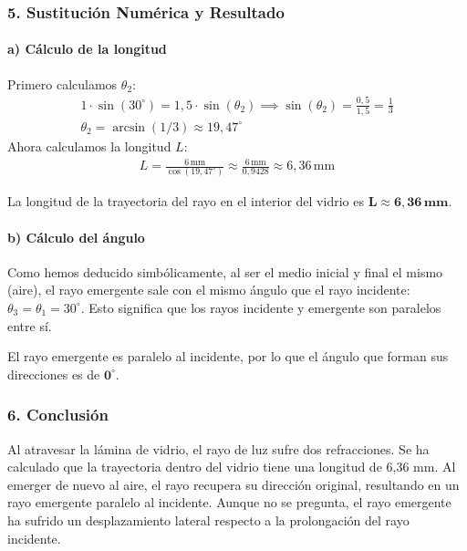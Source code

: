 \subsubsection*{5. Sustitución Numérica y Resultado}
\paragraph{a) Cálculo de la longitud}
Primero calculamos $\theta_2$:
\begin{gather}
    1 \cdot \sin(30^\circ) = 1,5 \cdot \sin(\theta_2) \implies \sin(\theta_2) = \frac{0,5}{1,5} = \frac{1}{3} \nonumber \\
    \theta_2 = \arcsin(1/3) \approx 19,47^\circ
\end{gather}
Ahora calculamos la longitud $L$:
\begin{gather}
    L = \frac{6\,\text{mm}}{\cos(19,47^\circ)} \approx \frac{6\,\text{mm}}{0,9428} \approx 6,36\,\text{mm}
\end{gather}
\begin{cajaresultado}
La longitud de la trayectoria del rayo en el interior del vidrio es $\boldsymbol{L \approx 6,36\,\textbf{mm}}$.
\end{cajaresultado}

\paragraph{b) Cálculo del ángulo}
Como hemos deducido simbólicamente, al ser el medio inicial y final el mismo (aire), el rayo emergente sale con el mismo ángulo que el rayo incidente: $\theta_3 = \theta_1 = 30^\circ$. Esto significa que los rayos incidente y emergente son paralelos entre sí.
\begin{cajaresultado}
El rayo emergente es paralelo al incidente, por lo que el ángulo que forman sus direcciones es de $\boldsymbol{0^\circ}$.
\end{cajaresultado}

\subsubsection*{6. Conclusión}
\begin{cajaconclusion}
Al atravesar la lámina de vidrio, el rayo de luz sufre dos refracciones. Se ha calculado que la trayectoria dentro del vidrio tiene una longitud de 6,36 mm. Al emerger de nuevo al aire, el rayo recupera su dirección original, resultando en un rayo emergente paralelo al incidente. Aunque no se pregunta, el rayo emergente ha sufrido un desplazamiento lateral respecto a la prolongación del rayo incidente.
\end{cajaconclusion}

